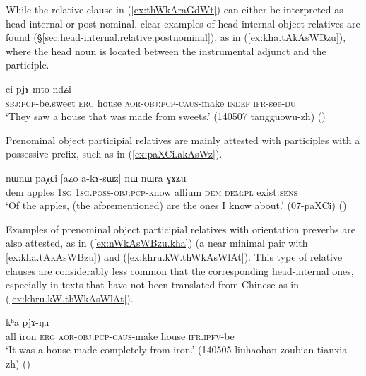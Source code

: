 While the relative clause in (\ref{ex:thWkAraGdWt}) can either be interpreted as head-internal or post-nominal, clear examples of head-internal object relatives are found (§\ref{sec:head-internal.relative.postnominal}), as in (\ref{ex:kha.tAkAsWBzu}), where the head noun  is located between the instrumental adjunct  and the participle.
 
\begin{exe}
\ex \label{ex:kha.tAkAsWBzu}
 ci pjɤ-mto-ndʑi\\
\textsc{sbj}:\textsc{pcp}-be.sweet \textsc{erg} house \textsc{aor}-\textsc{obj}:\textsc{pcp}-\textsc{caus}-make \textsc{indef} \textsc{ifr}-see-\textsc{du}\\
\glt `They saw a house that was made from sweets.' (140507 tangguowu-zh)
()
\end{exe}

Prenominal object participial relatives are mainly attested with participles with a possessive prefix, such as  in (\ref{ex:paXCi.akAsWz}). 

\begin{exe}
\ex \label{ex:paXCi.akAsWz}
\gll   nɯnɯ paχɕi [aʑo a-kɤ-sɯz] nɯ nɯra ɣɤʑu \\
dem apples \textsc{1sg} \textsc{1sg}.\textsc{poss}-\textsc{obj}:\textsc{pcp}-know allium \textsc{dem} \textsc{dem}:\textsc{pl} exist:\textsc{sens} \\
\glt `Of the apples, (the aforementioned) are the ones I know about.' (07-paXCi)
()
\end{exe}  

Examples of prenominal object participial relatives with orientation preverbs are also attested, as in (\ref{ex:nWkAsWBzu.kha}) (a near minimal pair with \ref{ex:kha.tAkAsWBzu}) and (\ref{ex:khru.kW.thWkAsWlAt}). This type of relative clauses are considerably less common that the corresponding head-internal ones, especially in texts that have not been translated from Chinese as in (\ref{ex:khru.kW.thWkAsWlAt}).

\begin{exe}
\ex \label{ex:nWkAsWBzu.kha}
 kʰa pjɤ-ŋu \\
all iron \textsc{erg} \textsc{aor}-\textsc{obj}:\textsc{pcp}-\textsc{caus}-make house \textsc{ifr}.\textsc{ipfv}-be \\
\glt `It was a house made completely from iron.' (140505 liuhaohan zoubian tianxia-zh)
()
\end{exe}


